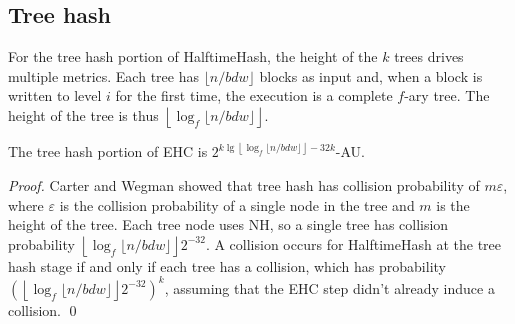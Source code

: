\documentclass[runningheads]{llncs}
\begin{document}










\subsection{Tree hash}

For the tree hash portion of HalftimeHash, the height of the $k$ trees drives multiple metrics.
Each tree has $\lfloor n / b d w \rfloor$ blocks as input and, when a block is written to level $i$ for the first time, the execution is a complete $f$-ary tree.
The height of the tree is thus $\left\lfloor \log_f \lfloor n / b d w \rfloor \right\rfloor$.

\begin{lemma}
The tree hash portion of EHC is $2^{ k\lg\left\lfloor\log_f \lfloor n/b d w\rfloor\right\rfloor - 32k}$-AU.
\end{lemma}
\begin{proof}
  Carter and Wegman showed that tree hash has collision probability of $m \varepsilon$, where $\varepsilon$ is the collision probability of a single node in the tree and $m$ is the height of the tree.
  Each tree node uses NH, so a single tree has collision probability $\left\lfloor \log_f \lfloor n / b d w \rfloor \right\rfloor 2^{-32}$.
  A collision occurs for HalftimeHash at the tree hash stage if and only if each tree has a collision, which has probability $\left(\left\lfloor \log_f \lfloor n / b d w \rfloor \right\rfloor 2^{-32}\right)^k$, assuming that the EHC step didn't already induce a collision. \qed
\end{proof}
\end{document}
